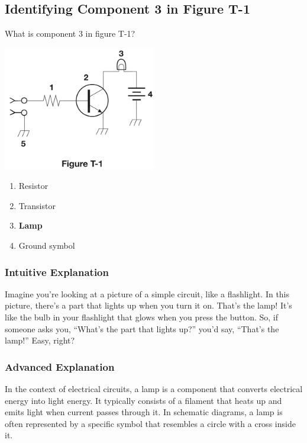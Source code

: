 \subsection{Identifying Component 3 in Figure T-1}
\label{T6C04}

\begin{tcolorbox}[colback=gray!10!white,colframe=black!75!black,title=T6C04]
What is component 3 in figure T-1?

\includegraphics[width=0.5\textwidth]{tech/images/t1.png} 



\begin{enumerate}[label=\Alph*)]
    \item Resistor
    \item Transistor
    \item \textbf{Lamp}
    \item Ground symbol
\end{enumerate}
\end{tcolorbox}

\subsubsection{Intuitive Explanation}
Imagine you’re looking at a picture of a simple circuit, like a flashlight. In this picture, there’s a part that lights up when you turn it on. That’s the lamp! It’s like the bulb in your flashlight that glows when you press the button. So, if someone asks you, “What’s the part that lights up?” you’d say, “That’s the lamp!” Easy, right?

\subsubsection{Advanced Explanation}
In the context of electrical circuits, a lamp is a component that converts electrical energy into light energy. It typically consists of a filament that heats up and emits light when current passes through it. In schematic diagrams, a lamp is often represented by a specific symbol that resembles a circle with a cross inside it. 

